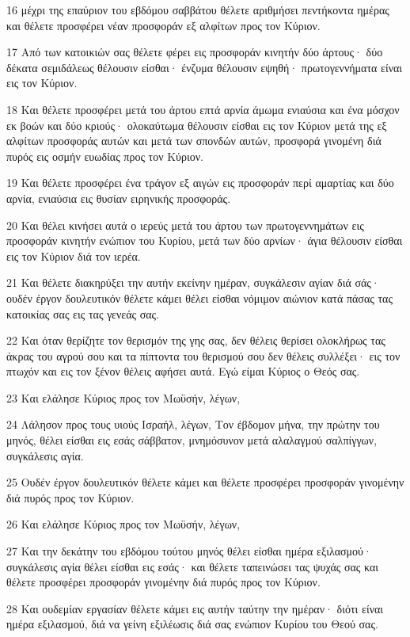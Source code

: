 \par 16 μέχρι της επαύριον του εβδόμου σαββάτου θέλετε αριθμήσει πεντήκοντα ημέρας και θέλετε προσφέρει νέαν προσφοράν εξ αλφίτων προς τον Κύριον.
\par 17 Από των κατοικιών σας θέλετε φέρει εις προσφοράν κινητήν δύο άρτους· δύο δέκατα σεμιδάλεως θέλουσιν είσθαι· ένζυμα θέλουσιν εψηθή· πρωτογεννήματα είναι εις τον Κύριον.
\par 18 Και θέλετε προσφέρει μετά του άρτου επτά αρνία άμωμα ενιαύσια και ένα μόσχον εκ βοών και δύο κριούς· ολοκαύτωμα θέλουσιν είσθαι εις τον Κύριον μετά της εξ αλφίτων προσφοράς αυτών και μετά των σπονδών αυτών, προσφορά γινομένη διά πυρός εις οσμήν ευωδίας προς τον Κύριον.
\par 19 Και θέλετε προσφέρει ένα τράγον εξ αιγών εις προσφοράν περί αμαρτίας και δύο αρνία, ενιαύσια εις θυσίαν ειρηνικής προσφοράς.
\par 20 Και θέλει κινήσει αυτά ο ιερεύς μετά του άρτου των πρωτογεννημάτων εις προσφοράν κινητήν ενώπιον του Κυρίου, μετά των δύο αρνίων· άγια θέλουσιν είσθαι εις τον Κύριον διά τον ιερέα.
\par 21 Και θέλετε διακηρύξει την αυτήν εκείνην ημέραν, συγκάλεσιν αγίαν διά σάς· ουδέν έργον δουλευτικόν θέλετε κάμει θέλει είσθαι νόμιμον αιώνιον κατά πάσας τας κατοικίας σας εις τας γενεάς σας.
\par 22 Και όταν θερίζητε τον θερισμόν της γης σας, δεν θέλεις θερίσει ολοκλήρως τας άκρας του αγρού σου και τα πίπτοντα του θερισμού σου δεν θέλεις συλλέξει· εις τον πτωχόν και εις τον ξένον θέλεις αφήσει αυτά. Εγώ είμαι Κύριος ο Θεός σας.
\par 23 Και ελάλησε Κύριος προς τον Μωϋσήν, λέγων,
\par 24 Λάλησον προς τους υιούς Ισραήλ, λέγων, Τον έβδομον μήνα, την πρώτην του μηνός, θέλει είσθαι εις εσάς σάββατον, μνημόσυνον μετά αλαλαγμού σαλπίγγων, συγκάλεσις αγία.
\par 25 Ουδέν έργον δουλευτικόν θέλετε κάμει και θέλετε προσφέρει προσφοράν γινομένην διά πυρός προς τον Κύριον.
\par 26 Και ελάλησε Κύριος προς τον Μωϋσήν, λέγων,
\par 27 Και την δεκάτην του εβδόμου τούτου μηνός θέλει είσθαι ημέρα εξιλασμού· συγκάλεσις αγία θέλει είσθαι εις εσάς· και θέλετε ταπεινώσει τας ψυχάς σας και θέλετε προσφέρει προσφοράν γινομένην διά πυρός προς τον Κύριον.
\par 28 Και ουδεμίαν εργασίαν θέλετε κάμει εις αυτήν ταύτην την ημέραν· διότι είναι ημέρα εξιλασμού, διά να γείνη εξιλέωσις διά σας ενώπιον Κυρίου του Θεού σας.
